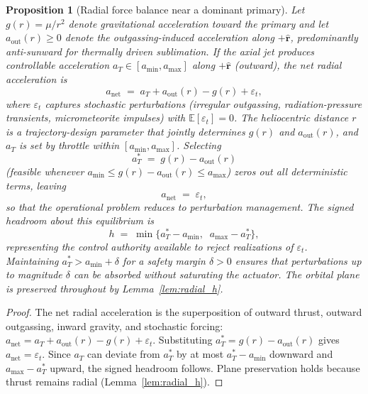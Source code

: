 \documentclass{article}
\newtheorem{proposition}{Proposition}
\begin{document}
\begin{proposition}[Radial force balance near a dominant primary]
\label{prop:gravity_bias_authority}
Let $g(r)=\mu/r^2$ denote gravitational acceleration toward the primary and let $a_{\mathrm{out}}(r)\ge 0$ denote the outgassing-induced acceleration along $+\hat{\mathbf r}$, predominantly anti-sunward for thermally driven sublimation. If the axial jet produces controllable acceleration $a_T\in[a_{\min},a_{\max}]$ along $+\hat{\mathbf r}$ (outward), the net radial acceleration is
\begin{equation}
a_{\mathrm{net}} \;=\; a_T + a_{\mathrm{out}}(r) - g(r) + \varepsilon_t,
\label{eq:radial_balance}
\end{equation}
where $\varepsilon_t$ captures stochastic perturbations (irregular outgassing, radiation-pressure transients, micrometeorite impulses) with $\mathbb{E}[\varepsilon_t]=0$. The heliocentric distance $r$ is a trajectory-design parameter that jointly determines $g(r)$ and $a_{\mathrm{out}}(r)$, and $a_T$ is set by throttle within $[a_{\min},a_{\max}]$. Selecting
\begin{equation}
a_T^* \;=\; g(r)-a_{\mathrm{out}}(r)
\label{eq:aT_star}
\end{equation}
(feasible whenever $a_{\min}\le g(r)-a_{\mathrm{out}}(r)\le a_{\max}$) zeros out all deterministic terms, leaving
\begin{equation}
a_{\mathrm{net}} \;=\; \varepsilon_t,
\end{equation}
so that the operational problem reduces to perturbation management. The signed headroom about this equilibrium is
\begin{equation}
h \;=\; \min\!\bigl\{a_T^*-a_{\min},\;\; a_{\max}-a_T^*\bigr\},
\label{eq:headroom}
\end{equation}
representing the control authority available to reject realizations of $\varepsilon_t$. Maintaining $a_T^*>a_{\min}+\delta$ for a safety margin $\delta>0$ ensures that perturbations up to magnitude $\delta$ can be absorbed without saturating the actuator. The orbital plane is preserved throughout by Lemma~\ref{lem:radial_h}.
\end{proposition}

\begin{proof}
The net radial acceleration is the superposition of outward thrust, outward outgassing, inward gravity, and stochastic forcing: $a_{\mathrm{net}}=a_T+a_{\mathrm{out}}(r)-g(r)+\varepsilon_t$. Substituting $a_T^*=g(r)-a_{\mathrm{out}}(r)$ gives $a_{\mathrm{net}}=\varepsilon_t$. Since $a_T$ can deviate from $a_T^*$ by at most $a_T^*-a_{\min}$ downward and $a_{\max}-a_T^*$ upward, the signed headroom follows. Plane preservation holds because thrust remains radial (Lemma~\ref{lem:radial_h}).
\end{proof}
\end{document}
